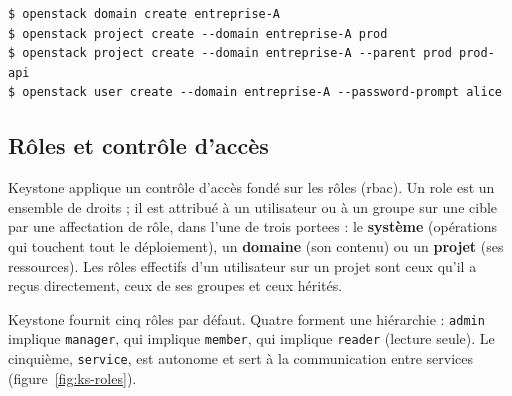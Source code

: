\par\noindent\begin{minipage}{\linewidth}
\begin{lstlisting}[style=terminal]
$ openstack domain create entreprise-A
$ openstack project create --domain entreprise-A prod
$ openstack project create --domain entreprise-A --parent prod prod-api
$ openstack user create --domain entreprise-A --password-prompt alice
\end{lstlisting}
\end{minipage}\par

\subsection{Rôles et contrôle d'accès}\label{sec:ks-rbac}

Keystone applique un contrôle d'accès fondé sur les rôles (\gls{rbac}). Un \gls{role} est un
ensemble de droits ; il est attribué à un utilisateur ou à un groupe sur une cible par une
affectation de rôle, dans l'une de trois \glspl{portee} \parencite{keystone-roles} : le \textbf{système} (opérations qui touchent tout
le déploiement), un \textbf{domaine} (son contenu) ou un \textbf{projet} (ses ressources). Les rôles effectifs d'un utilisateur sur un
projet sont ceux qu'il a reçus directement, ceux de ses groupes et ceux hérités.

Keystone fournit cinq rôles par défaut. Quatre forment une hiérarchie : \texttt{admin} implique
\texttt{manager}, qui implique \texttt{member}, qui implique \texttt{reader} (lecture seule). Le cinquième,
\texttt{service}, est autonome et sert à la communication entre services (figure~\ref{fig:ks-roles}).

